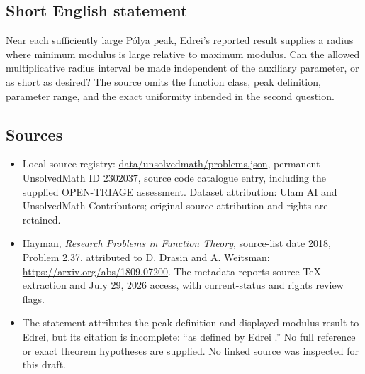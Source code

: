 \documentclass[11pt]{article}
\begin{document}
\subsection{Short English statement}
Near each sufficiently large P\'olya peak, Edrei's reported result supplies a radius where minimum modulus is large relative to maximum modulus. Can the allowed multiplicative radius interval be made independent of the auxiliary parameter, or as short as desired? The source omits the function class, peak definition, parameter range, and the exact uniformity intended in the second question.
\subsection{Sources}
\begin{itemize}
\item Local source registry: \url{data/unsolvedmath/problems.json}, permanent UnsolvedMath ID $2302037$, source code catalogue entry, including the supplied OPEN-TRIAGE assessment. Dataset attribution: Ulam AI and UnsolvedMath Contributors; original-source attribution and rights are retained.
\item Hayman, \emph{Research Problems in Function Theory}, source-list date 2018, Problem 2.37, attributed to D. Drasin and A. Weitsman: \url{https://arxiv.org/abs/1809.07200}. The metadata reports source-TeX extraction and July 29, 2026 access, with current-status and rights review flags.
\item The statement attributes the peak definition and displayed modulus result to Edrei, but its citation is incomplete: ``as defined by Edrei .'' No full reference or exact theorem hypotheses are supplied. No linked source was inspected for this draft.
\end{itemize}
\end{document}
